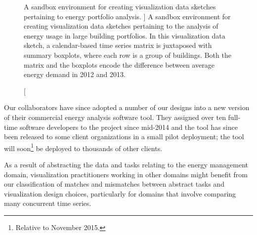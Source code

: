 \begin{figure}
    \centering
    \caption
    [
         A sandbox environment for creating visualization data sketches pertaining to energy portfolio analysis.
    ]{
        A sandbox environment for creating visualization data sketches pertaining to the analysis of energy usage in large building portfolios. In this visualization data sketch, a calendar-based time series matrix is juxtaposed with summary boxplots, where each row is a group of buildings. Both the matrix and the boxplots encode the difference between average energy demand in 2012 and 2013.
    }
    \label{fig:pulse-cal}
    \centering
\end{figure}


Our collaborators have since adopted a number of our designs into a new version of their commercial energy analysis software tool.
They assigned over ten full-time software developers to the project since mid-2014 and the tool has since been released to some client organizations in a small pilot deployment; the tool will soon\footnote{Relative to November 2015.} be deployed to thousands of other clients.

As a result of abstracting the data and tasks relating to the energy management domain, visualization practitioners working in other domains might benefit from our classification of matches and mismatches between abstract tasks and visualization design choices, particularly for domains that involve comparing many concurrent time series.

